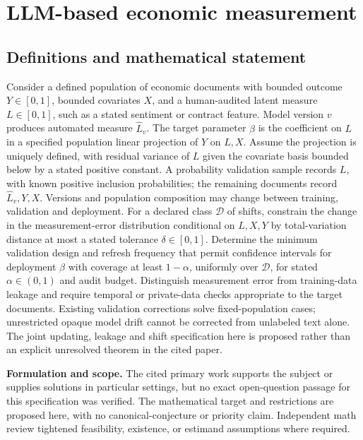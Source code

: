 \documentclass[11pt]{article}
\begin{document}
\section*{LLM-based economic measurement}\label{30007709}
\subsection{Definitions and mathematical statement}
Consider a defined population of economic documents with bounded outcome \(Y\in[0,1]\), bounded covariates \(X\), and a human-audited latent measure \(L\in[0,1]\), such as a stated sentiment or contract feature. Model version \(v\) produces automated measure \(\widehat L_v\). The target parameter \(\beta\) is the coefficient on \(L\) in a specified population linear projection of \(Y\) on \(L,X\). Assume the projection is uniquely defined, with residual variance of \(L\) given the covariate basis bounded below by a stated positive constant. A probability validation sample records \(L\), with known positive inclusion probabilities; the remaining documents record \(\widehat L_v,Y,X\). Versions and population composition may change between training, validation and deployment. For a declared class \(\mathcal D\) of shifts, constrain the change in the measurement-error distribution conditional on \(L,X,Y\) by total-variation distance at most a stated tolerance \(\delta\in[0,1]\). Determine the minimum validation design and refresh frequency that permit confidence intervals for deployment \(\beta\) with coverage at least \(1-\alpha\), uniformly over \(\mathcal D\), for stated \(\alpha\in(0,1)\) and audit budget. Distinguish measurement error from training-data leakage and require temporal or private-data checks appropriate to the target documents. Existing validation corrections solve fixed-population cases; unrestricted opaque model drift cannot be corrected from unlabeled text alone. The joint updating, leakage and shift specification here is proposed rather than an explicit unresolved theorem in the cited paper.

\par\textbf{Formulation and scope.} The cited primary work supports the subject or supplies solutions in particular settings, but no exact open-question passage for this specification was verified. The mathematical target and restrictions are proposed here, with no canonical-conjecture or priority claim. Independent math review tightened feasibility, existence, or estimand assumptions where required.
\end{document}
